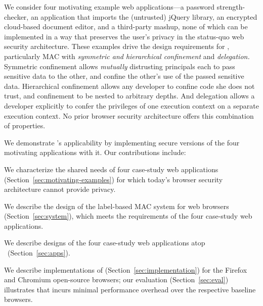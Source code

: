 We consider four motivating example web ap\-pli\-ca\-tions---a
password strength-checker, an application that imports the (untrusted)
jQuery library, an encrypted cloud-based document editor, and a
third-party mashup, none of which can be implemented in a way that
preserves the user's privacy in the status-quo web security
architecture. These examples drive the design requirements for \sys{},
particularly MAC with \emph{symmetric and hierarchical confinement} and
{\em delegation.}  Symmetric confinement allows \emph{mutually}
distrusting principals each to pass sensitive data to the other, and
confine the other's use of the passed sensitive data. Hierarchical
confinement allows any developer to confine code she does not trust,
and confinement to be nested to arbitrary depths. And delegation
allows a developer explicitly to confer the privileges of one execution
context on a separate execution context.
%
No prior browser security architecture offers this combination of
properties.

We demonstrate \sys{}'s applicability by implementing
secure versions of the four motivating applications with it.
Our contributions include:

\begin{CompactItemize}
\item We characterize the shared needs of four case-study web applications
  (Section~\ref{sec:motivating-examples}) for which today's browser
  security architecture cannot provide privacy.
\item We describe the design of the \sys{} label-based MAC system
  for web browsers (Section~\ref{sec:system}), which meets the
  requirements of the four case-study web applications.
\item We describe designs of the four case-study web applications atop
  \sys~(Section~\ref{sec:apps}).
\item We describe implementations of \sys{}
  (Section~\ref{sec:implementation}) for the Firefox and Chromium
  open-source browsers; our evaluation (Section~\ref{sec:eval})
  illustrates that \sys{} incurs minimal performance overhead over the
  respective baseline browsers.
\end{CompactItemize}

